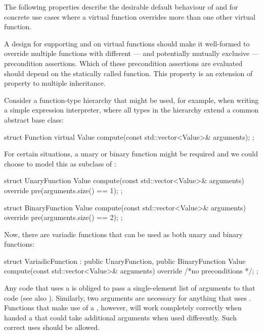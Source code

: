 The following properties describe the desirable default behaviour of  and  for concrete use cases where a virtual function overrides  more than one other virtual function.


A design for supporting  and  on virtual functions should make it well-formed to override multiple functions with different --- and potentially mutually exclusive --- precondition assertions. Which of these precondition assertions are evaluated should depend on the statically called function. This property is an extension of property  to multiple inheritance.

Consider a function-type hierarchy that might be used, for example, when writing
a simple expression interpreter, where all types in the hierarchy extend a common abstract base
class:

\begin{codeblock}
struct Function {
  virtual Value compute(const std::vector<Value>& arguments);
};
\end{codeblock}

For certain situations, a unary or binary function might be required and we could choose to model
this as subclass of :

\begin{codeblock}
struct UnaryFunction {
  Value compute(const std::vector<Value>& arguments) override
    pre(arguments.size() == 1);
};

struct BinaryFunction {
  Value compute(const std::vector<Value>& arguments) override
    pre(arguments.size() == 2);
};
\end{codeblock}

Now, there are variadic functions that can be used as both unary and binary functions:

\begin{codeblock}
struct VariadicFunction : public UnaryFunction, public BinaryFunction {
  Value compute(const std::vector<Value>& arguments) override
    /*no preconditions */;
};
\end{codeblock}

Any code that uses a  is obliged to pass a single-element list of arguments to that
code (see also ). Similarly, two arguments are necessary for anything that uses . Functions that make use of a , however, will work completely correctly when handed a  that could take additional arguments when used differently. Such correct uses should be allowed.

